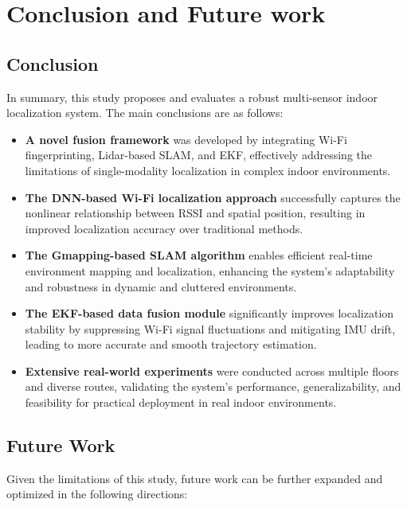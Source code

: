 \documentclass[12pt,a4paper]{article}
\numberwithin{equation}{section}
\begin{document}
\section{Conclusion and Future work}
\subsection{Conclusion}
In summary, this study proposes and evaluates a robust multi-sensor indoor localization system. The main conclusions are as follows:

\begin{itemize}
  \item \textbf{A novel fusion framework} was developed by integrating Wi-Fi fingerprinting, Lidar-based SLAM, and EKF, effectively addressing the limitations of single-modality localization in complex indoor environments.
  
  \item \textbf{The DNN-based Wi-Fi localization approach} successfully captures the nonlinear relationship between RSSI and spatial position, resulting in improved localization accuracy over traditional methods.
  
  \item \textbf{The Gmapping-based SLAM algorithm} enables efficient real-time environment mapping and localization, enhancing the system's adaptability and robustness in dynamic and cluttered environments.
  
  \item \textbf{The EKF-based data fusion module} significantly improves localization stability by suppressing Wi-Fi signal fluctuations and mitigating IMU drift, leading to more accurate and smooth trajectory estimation.
  
  \item \textbf{Extensive real-world experiments} were conducted across multiple floors and diverse routes, validating the system’s performance, generalizability, and feasibility for practical deployment in real indoor environments.
\end{itemize}
\subsection{Future Work}

Given the limitations of this study, future work can be further expanded and optimized in the following directions:
\end{document}
